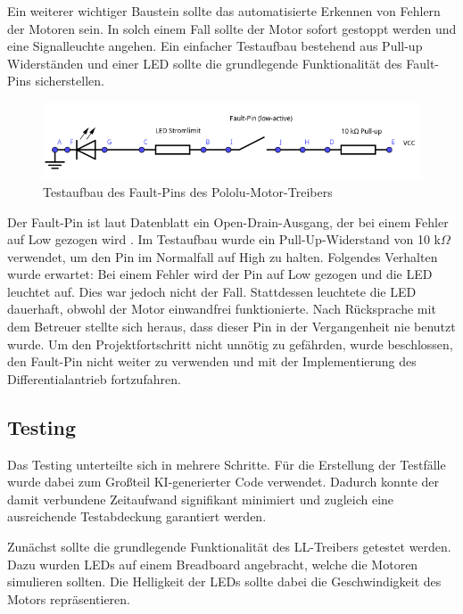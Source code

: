 Ein weiterer wichtiger Baustein sollte das automatisierte Erkennen von Fehlern der Motoren sein. In solch einem Fall sollte der Motor sofort gestoppt werden und eine Signalleuchte angehen. Ein einfacher Testaufbau bestehend aus Pull-up Widerständen und einer LED sollte die grundlegende Funktionalität des Fault-Pins sicherstellen.

\begin{figure}[h]
    \centering
    \includegraphics[width=\textwidth]{images/motor_driver_fault_pin.png}
    \caption{Testaufbau des Fault-Pins des Pololu-Motor-Treibers}
    \label{fig:motor_driver_fault_pin}
\end{figure}

Der Fault-Pin ist laut Datenblatt ein Open-Drain-Ausgang, der bei einem Fehler auf Low gezogen wird \cite{pololu_g2_motor_driver}. Im Testaufbau wurde ein Pull-Up-Widerstand von 10 k$\Omega$ verwendet, um den Pin im Normalfall auf High zu halten. Folgendes Verhalten wurde erwartet: Bei einem Fehler wird der Pin auf Low gezogen und die LED leuchtet auf. Dies war jedoch nicht der Fall. Stattdessen leuchtete die LED dauerhaft, obwohl der Motor einwandfrei funktionierte. Nach Rücksprache mit dem Betreuer stellte sich heraus, dass dieser Pin in der Vergangenheit nie benutzt wurde. Um den Projektfortschritt nicht unnötig zu gefährden, wurde beschlossen, den Fault-Pin nicht weiter zu verwenden und mit der Implementierung des Differentialantrieb fortzufahren.

\subsection{Testing}

Das Testing unterteilte sich in mehrere Schritte. Für die Erstellung der Testfälle wurde dabei zum Großteil KI-generierter Code verwendet. Dadurch konnte der damit verbundene Zeitaufwand signifikant minimiert und zugleich eine ausreichende Testabdeckung garantiert werden. \newline

Zunächst sollte die grundlegende Funktionalität des LL-Treibers getestet werden. Dazu wurden LEDs auf einem Breadboard angebracht, welche die Motoren simulieren sollten. Die Helligkeit der LEDs sollte dabei die Geschwindigkeit des Motors repräsentieren. \newline

